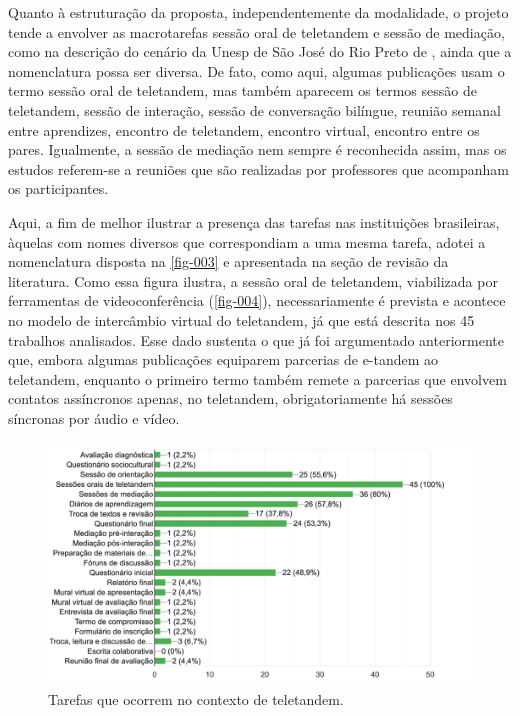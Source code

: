 \documentclass[portuguese]{textolivre}
\begin{document}
Quanto à estruturação da proposta, independentemente da modalidade, o projeto tende a envolver as macrotarefas sessão oral de teletandem e sessão de mediação, como na descrição do cenário da Unesp de São José do Rio Preto de \textcite{aranha2017}, ainda que a nomenclatura possa ser diversa. De fato, como aqui, algumas publicações usam o termo sessão oral de teletandem, mas também aparecem os termos sessão de teletandem, sessão de interação, sessão de conversação bilíngue, reunião semanal entre aprendizes, encontro de teletandem, encontro virtual, encontro entre os pares. Igualmente, a sessão de mediação nem sempre é reconhecida assim, mas os estudos referem-se a reuniões que são realizadas por professores que acompanham os participantes.

Aqui, a fim de melhor ilustrar a presença das tarefas nas instituições brasileiras, àquelas com nomes diversos que correspondiam a uma mesma tarefa, adotei a nomenclatura disposta na \autoref{fig-003} e apresentada na seção de revisão da literatura. Como essa figura ilustra, a sessão oral de teletandem, viabilizada por ferramentas de videoconferência (\autoref{fig-004}), necessariamente é prevista e acontece no modelo de intercâmbio virtual do teletandem, já que está descrita nos 45 trabalhos analisados. Esse dado sustenta o que já foi argumentado anteriormente que, embora algumas publicações equiparem parcerias de e-tandem ao teletandem, enquanto o primeiro termo também remete a parcerias que envolvem contatos assíncronos apenas, no teletandem, obrigatoriamente há sessões síncronas por áudio e vídeo.

\begin{figure}[htbp]
  \centering
  \begin{minipage}{.75\textwidth}
    \includegraphics[width=\linewidth]{fig-003.png}
    \caption{Tarefas que ocorrem no contexto de teletandem.}
    \label{fig-003}
  \end{minipage}
\end{figure}
\end{document}
